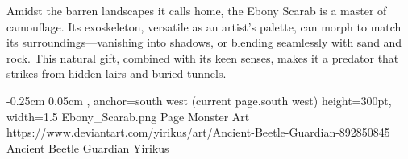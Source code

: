 Amidst the barren landscapes it calls home, the Ebony Scarab is a master of camouflage. Its exoskeleton, versatile as an artist's palette, can morph to match its surroundings—vanishing into shadows, or blending seamlessly with sand and rock. This natural gift, combined with its keen senses, makes it a predator that strikes from hidden lairs and buried tunnels.

%
{-0.25cm}%
{0.05cm}%
{, anchor=south west}%
{(current page.south west)}%
{height=300pt, width=1.5\textwidth}%
{Ebony_Scarab.png}%
	{Page \thepage}%
	{Monster Art}%
	{https://www.deviantart.com/yirikus/art/Ancient-Beetle-Guardian-892850845}%
	{Ancient Beetle Guardian}%
	{Yirikus}%

\vfill\eject %

